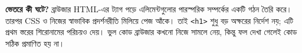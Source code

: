 \textbf{ভেতরে কী ঘটে?} ব্রাউজার HTML-এর ট্যাগ পড়ে এলিমেন্টগুলোর পারস্পরিক সম্পর্কের একটি গঠন তৈরি করে। তারপর CSS ও নিজের স্বাভাবিক প্রদর্শনরীতি মিলিয়ে পেজ আঁকে। তাই \texttt{<h1>} শুধু বড় অক্ষরের নির্দেশ নয়; এটি প্রথম স্তরের শিরোনামের পরিচয়ও দেয়। ভুল কোড ব্রাউজার কখনো নিজে সামলে নেয়, কিন্তু ফল দেখা গেলেই কোড সঠিক প্রমাণিত হয় না।
